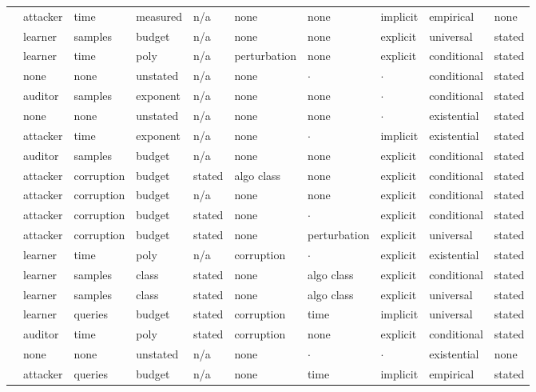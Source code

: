 \begin{landscape}
\begin{longtable}{rlllllllll}
\cite{SSZHTE24} & attacker & time & measured & n/a & none & none & implicit & empirical & none \\
\cite{MHS19} & learner & samples & budget & n/a & none & none & explicit & universal & stated \\
\cite{DNV19} & learner & time & poly & n/a & perturbation & none & explicit & conditional & stated \\
\cite{Sha23} & none & none & unstated & n/a & none & $\cdot$ & $\cdot$ & conditional & stated \\
\cite{NK26} & auditor & samples & exponent & n/a & none & none & $\cdot$ & conditional & stated \\
\cite{RCA24} & none & none & unstated & n/a & none & none & $\cdot$ & existential & stated \\
\cite{ZCSL24} & attacker & time & exponent & n/a & none & $\cdot$ & implicit & existential & stated \\
\cite{ZYWGW25} & auditor & samples & budget & n/a & none & none & explicit & conditional & stated \\
\cite{SKL17} & attacker & corruption & budget & stated & algo class & none & explicit & conditional & stated \\
\cite{LXSWLGZX25} & attacker & corruption & budget & n/a & none & none & explicit & conditional & stated \\
\cite{LCMER25} & attacker & corruption & budget & stated & none & $\cdot$ & explicit & conditional & stated \\
\cite{MMM19} & attacker & corruption & budget & stated & none & perturbation & explicit & universal & stated \\
\cite{DKKLMS16} & learner & time & poly & n/a & corruption & $\cdot$ & explicit & existential & stated \\
\cite{DIKR25} & learner & samples & class & stated & none & algo class & explicit & conditional & stated \\
\cite{WZDD24} & learner & samples & class & stated & none & algo class & explicit & universal & stated \\
\cite{BBHS22} & learner & queries & budget & stated & corruption & time & implicit & universal & stated \\
\cite{CHLX25} & auditor & time & poly & stated & corruption & none & explicit & conditional & stated \\
\cite{QMZAKFG22} & none & none & unstated & n/a & none & $\cdot$ & $\cdot$ & existential & none \\
\cite{NCM25} & attacker & queries & budget & n/a & none & time & implicit & empirical & stated \\

\end{longtable}
\end{landscape}
